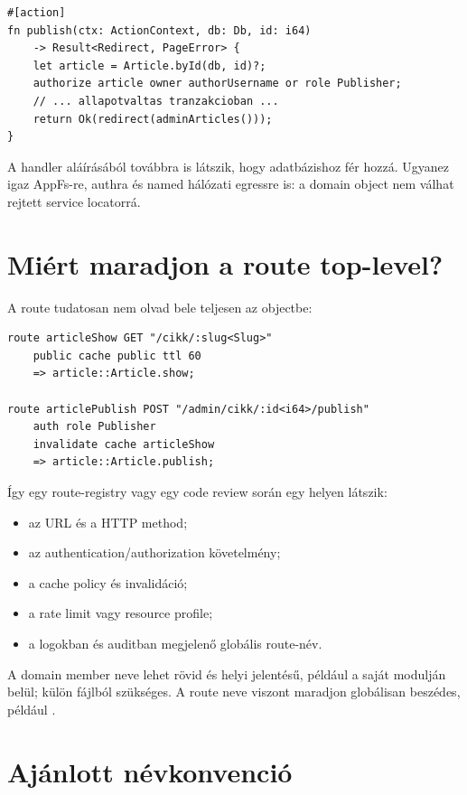 \begin{lstlisting}
#[action]
fn publish(ctx: ActionContext, db: Db, id: i64)
    -> Result<Redirect, PageError> {
    let article = Article.byId(db, id)?;
    authorize article owner authorUsername or role Publisher;
    // ... allapotvaltas tranzakcioban ...
    return Ok(redirect(adminArticles()));
}
\end{lstlisting}

A handler aláírásából továbbra is látszik, hogy adatbázishoz fér hozzá. Ugyanez igaz AppFs-re, authra és named hálózati egressre is: a domain object nem válhat rejtett service locatorrá.

\section{Miért maradjon a route top-level?}

A route tudatosan nem olvad bele teljesen az objectbe:

\begin{lstlisting}[language=Velran]
route articleShow GET "/cikk/:slug<Slug>"
    public cache public ttl 60
    => article::Article.show;

route articlePublish POST "/admin/cikk/:id<i64>/publish"
    auth role Publisher
    invalidate cache articleShow
    => article::Article.publish;
\end{lstlisting}

Így egy route-registry vagy egy code review során egy helyen látszik:

\begin{itemize}
  \item az URL és a HTTP method;
  \item az authentication/authorization követelmény;
  \item a cache policy és invalidáció;
  \item a rate limit vagy resource profile;
  \item a logokban és auditban megjelenő globális route-név.
\end{itemize}

A domain member neve lehet rövid és helyi jelentésű, például  a saját modulján belül; külön  fájlból  szükséges. A route neve viszont maradjon globálisan beszédes, például .

\section{Ajánlott névkonvenció}

